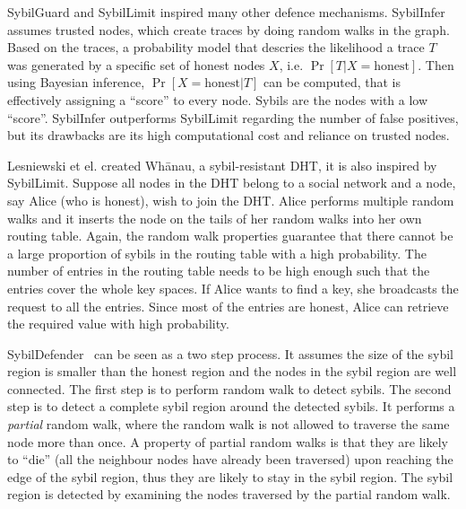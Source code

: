SybilGuard and SybilLimit inspired many other defence mechanisms.
SybilInfer\cite{danezis2009sybilinfer} assumes trusted nodes, which create
traces by doing random walks in the graph. Based on the traces, a probability
model that descries the likelihood a trace $T$ was generated by a specific set
of honest nodes $X$, i.e. $\Pr[ T | X = \text{honest}]$. Then using Bayesian
inference, $\Pr[ X = \text{honest}| T ]$ can be computed, that is effectively
assigning a ``score'' to every node. Sybils are the nodes with a low ``score''.
SybilInfer outperforms SybilLimit regarding the number of false positives, but
its drawbacks are its high computational cost and reliance on trusted nodes.

Lesniewski et el. created Wh\={a}nau, a sybil-resistant DHT, it is also inspired
by SybilLimit\cite{lesniewski2008sybil, lesniewski2010whanau}. Suppose all nodes
in the DHT belong to a social network and a node, say Alice (who is honest),
wish to join the DHT. Alice performs multiple random walks and it inserts the
node on the tails of her random walks into her own routing table. Again, the
random walk properties guarantee that there cannot be a large proportion of
sybils in the routing table with a high probability. The number of entries in
the routing table needs to be high enough such that the entries cover the whole
key spaces. If Alice wants to find a key, she broadcasts the request to all the
entries. Since most of the entries are honest, Alice can retrieve the required
value with high probability.

SybilDefender~\cite{wei2012sybildefender} can be seen as a two step process. It
assumes the size of the sybil region is smaller than the honest region and the
nodes in the sybil region are well connected. The first step is to perform
random walk to detect sybils. The second step is to detect a complete sybil
region around the detected sybils. It performs a \emph{partial} random walk,
where the random walk is not allowed to traverse the same node more than once. A
property of partial random walks is that they are likely to ``die'' (all the
neighbour nodes have already been traversed) upon reaching the edge of the sybil
region, thus they are likely to stay in the sybil region. The sybil region is
detected by examining the nodes traversed by the partial random walk.


